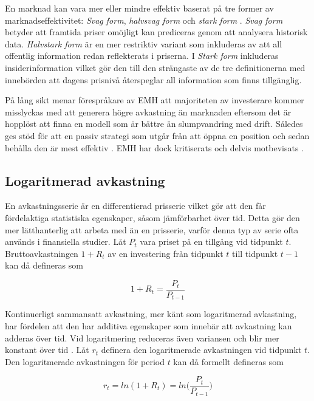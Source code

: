 \documentclass[11pt]{article}
\numberwithin{equation}{section}
\numberwithin{table}{section}
\numberwithin{figure}{section}
\begin{document}
En marknad kan vara mer eller mindre effektiv baserat på tre former av marknadseffektivitet: \emph{Svag form}, \emph{halvsvag form} och \emph{stark form} \parencite{Fama1970}. \emph{Svag form} betyder att framtida priser omöjligt kan prediceras genom att analysera historisk data. \emph{Halvstark form} är en mer restriktiv variant som inkluderas av att all offentlig information redan reflekterats i priserna. I \emph{Stark form} inkluderas insiderinformation vilket gör den till den strängaste av de tre definitionerna med innebörden att dagens prisnivå återspeglar all information som finns tillgänglig.

På lång sikt menar förespråkare av EMH att majoriteten av investerare kommer misslyckas med att generera högre avkastning än marknaden eftersom det är hopplöst att finna en modell som är bättre än slumpvandring med drift. Således ges stöd för att en passiv strategi som utgår från att öppna en position och sedan behålla den är mest effektiv \parencite{EMHforecast}. EMH har dock kritiserats och delvis motbevisats \parencite{basu1977investment, ball1978anomalies}.

\subsection{Logaritmerad avkastning}
En avkastningsserie är en differentierad prisserie vilket gör att den får fördelaktiga statistiska egenskaper, såsom jämförbarhet över tid. Detta gör den mer lätthanterlig att arbeta med än en prisserie, varför denna typ av serie ofta används i finansiella studier. Låt $P_{t}$ vara priset på en tillgång vid tidpunkt $t$. Bruttoavkastningen $1+R_t$ av en investering från tidpunkt $t$ till tidpunkt $t-1$ kan då defineras som

\begin{equation}
    1 + R_{t} = \frac{P_{t}}{P_{t-1}}
\end{equation}


Kontinuerligt sammansatt avkastning, mer känt som logaritmerad avkastning, har fördelen att den har additiva egenskaper som innebär att avkastning kan adderas över tid.  Vid logaritmering reduceras även variansen och blir mer konstant över tid \parencite{tsay}. Låt $r_{t}$ definera den logaritmerade avkastningen vid tidpunkt $t$. Den logaritmerade avkastningen för period $t$ kan då formellt defineras som

\begin{equation}
    r_{t} = ln(1+R_{t}) = ln \Big( \frac{P_{t}} {P_{t-1}} \Big)
\end{equation}
\end{document}
